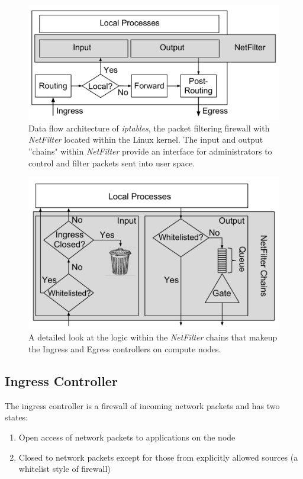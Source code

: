 \documentclass[oneside,12pt]{memoir}
\begin{document}
\begin{figure}
\centering
\includegraphics[scale=0.55]{netfilter_chain.pdf}
\caption{Data flow architecture of \textit{iptables}, the packet filtering firewall with \textit{NetFilter} located within the Linux kernel. The input and output ''chains" within \textit{NetFilter} provide an interface for administrators to control and filter packets sent into user space.}
\label{fig:netfilter_chain}
\end{figure}
\begin{figure}
\centering
\includegraphics[scale=0.57]{netfilter_in_out_chains.pdf}
\caption{A detailed look at the logic within the \textit{NetFilter} chains that makeup the Ingress and Egress controllers on compute nodes.}
\label{fig:netfilter_in_out_chains}
\end{figure}

\subsection{Ingress Controller}
The ingress controller is a firewall of incoming network packets and has two states:
\begin{enumerate} \itemsep1pt \parskip0pt 
\item Open access of network packets to applications on the node
\item Closed to network packets except for those from explicitly allowed sources (a whitelist style of firewall)
\end{enumerate}
\end{document}
